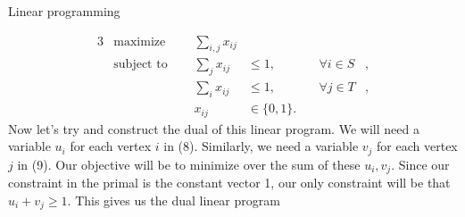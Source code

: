 \documentclass[11pt]{article}
\renewcommand{\'}{^{'}}
\begin{document}
\begin{section}{Linear programming}

	\begin{alignat}{3}
		& \text{maximize } & \sum_{i,j} x_{ij}& \\
		& \text{subject to } \quad & \sum_{j} x_{ij} & \leq 1, & \quad \forall i\in S&, \\
				     &\quad & \sum_{i} x_{ij} & \leq 1, & \quad \forall j\in T &, \\
				&& x_{ij} & \in \{0,1\}.
	\end{alignat}
	Now let's try and construct the dual of this linear program. We will need a variable 
	$u_i$ for each vertex $i$ in (8). Similarly, we need a variable $v_j$ for each vertex $j$ in 
	(9). Our objective will be to minimize over the sum of these $u_i,v_j$. Since our constraint 
	in the primal is the constant vector 1, our only constraint will be that $u_i + v_j \geq 1$. 
	This gives us the dual linear program



\end{section}
\end{document}
